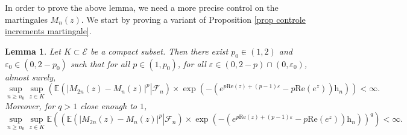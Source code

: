 \documentclass[11pt]{article}
\newtheorem{lemma}[theorem]{Lemma}
\numberwithin{equation}{section}
\def\vp{\varepsilon}
\def\E{\mathbb{E}}
\renewcommand{\Re}{\mathrm{Re}}
\begin{document}
In order to prove the above lemma, we need a more precise control on the martingales $M_n(z)$. We start by proving a variant of Proposition \ref{prop controle increments martingale}.
\begin{lemma}\label{lemme variante controle increments martingale}
	Let $K \subset \mathcal{E}$ be a compact subset. Then there exist $p_0 \in (1,2)$ and $\vp_0 \in (0, 2-p_0)$ such that for all $p \in (1,p_0)$, for all $\vp \in (0,2-p)\cap (0, \vp_0)$, almost surely,
	\[
 \sup_{n\ge n_0} \sup_{z \in K}\left( \E\left( \left. \left\vert M_{2n}(z)- M_n(z)\right\vert^p \right\vert \mathcal{F}_n\right) \times \exp\left( -\left(e^{p \Re(z) +(p-1)\vp}-p\Re(e^z)\right) \mathrm{h}_n \right)\right) <\infty.
	\] 
	Moreover, for $q>1$ close enough to $1$, 
	\[
	\sup_{n\ge n_0} \sup_{z \in K}  \E\left(  \left( \E\left( \left. \left\vert M_{2n}(z)- M_n(z)\right\vert^p \right\vert \mathcal{F}_n\right) \times \exp\left( -\left(e^{p \Re(z) +(p-1)\vp}-p\Re(e^z)\right) \mathrm{h}_n \right)\right)^q \right) <\infty.
	\] 
\end{lemma}
\end{document}
